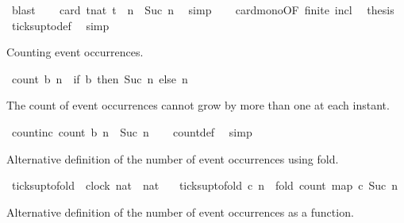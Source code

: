 \begin{isabellebody}
\ blast\isanewline
\ \ \isamarkupfalse%
\ {\isacartoucheopen}card\ {\isacharbraceleft}t{\isacharcolon}{\isacharcolon}nat{\isachardot}\ t\ {\isasymle}\ n{\isacharbraceright}\ {\isacharequal}\ Suc\ n{\isacartoucheclose}\ \isamarkupfalse%
\ simp\isanewline
\ \ \isamarkupfalse%
\ card{\isacharunderscore}mono{\isacharbrackleft}OF\ finite\ incl{\isacharbrackright}\ \isamarkupfalse%
\ {\isacharquery}thesis\ \isamarkupfalse%
\ ticks{\isacharunderscore}up{\isacharunderscore}to{\isacharunderscore}def\ \isamarkupfalse%
\ simp\isanewline
{}\isamarkupfalse%
%
\endisatagproof
{\isafoldproof}%
%
\isadelimproof
%
\endisadelimproof
%
\begin{isamarkuptext}%
Counting event occurrences.%
\end{isamarkuptext}\isamarkuptrue%
\isamarkupfalse%
\ {\isacartoucheopen}count\ b\ n\ {\isasymequiv}\ if\ b\ then\ Suc\ n\ else\ n{\isacartoucheclose}%
\begin{isamarkuptext}%
The count of event occurrences cannot grow by more than one at each instant.%
\end{isamarkuptext}\isamarkuptrue%
\isamarkupfalse%
\ count{\isacharunderscore}inc{\isacharcolon}\ {\isacartoucheopen}count\ b\ n\ {\isasymle}\ Suc\ n{\isacartoucheclose}\isanewline
%
\isadelimproof
\ \ %
\endisadelimproof
%
\isatagproof
{}\isamarkupfalse%
\ count{\isacharunderscore}def\ \isamarkupfalse%
\ simp%
\endisatagproof
{\isafoldproof}%
%
\isadelimproof
%
\endisadelimproof
%
\begin{isamarkuptext}%
Alternative definition of the number of event occurrences using fold.%
\end{isamarkuptext}\isamarkuptrue%
\isamarkupfalse%
\ ticks{\isacharunderscore}up{\isacharunderscore}to{\isacharunderscore}fold\ {\isacharcolon}{\isacharcolon}\ {\isacartoucheopen}{\isacharbrackleft}clock{\isacharcomma}\ nat{\isacharbrackright}\ {\isasymRightarrow}\ nat{\isacartoucheclose}\isanewline
\ \ \ {\isacartoucheopen}ticks{\isacharunderscore}up{\isacharunderscore}to{\isacharunderscore}fold\ c\ n\ {\isacharequal}\ fold\ count\ {\isacharparenleft}map\ c\ {\isacharbrackleft}{}{\isachardot}{\isachardot}{\isacharless}Suc\ n{\isacharbrackright}{\isacharparenright}\ {}{\isacartoucheclose}%
\begin{isamarkuptext}%
Alternative definition of the number of event occurrences as a function.%

\end{isamarkuptext}
\end{isabellebody}
